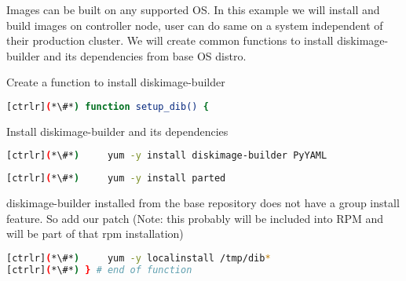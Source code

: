 
	Images can be built on any supported OS. In this example we will install and build images on controller node, user can do same on a system independent of their production cluster. We will create common functions to install diskimage-builder and its dependencies from base OS distro.

	Create a function to install diskimage-builder

\begin{lstlisting}[language=bash,keywords={}]
[ctrlr](*\#*) function setup_dib() {
\end{lstlisting}
	Install diskimage-builder and its dependencies
\begin{lstlisting}[language=bash,keywords={}]
[ctrlr](*\#*)     yum -y install diskimage-builder PyYAML

\end{lstlisting}

\begin{lstlisting}[language=bash,keywords={}]
[ctrlr](*\#*)     yum -y install parted
\end{lstlisting}

	diskimage-builder installed from the base repository does not have a group install feature. So add our patch (Note: this probably will be included into RPM and will be part of that rpm installation)


\begin{lstlisting}[language=bash,keywords={}]
[ctrlr](*\#*)     yum -y localinstall /tmp/dib*
[ctrlr](*\#*) } # end of function
\end{lstlisting}
